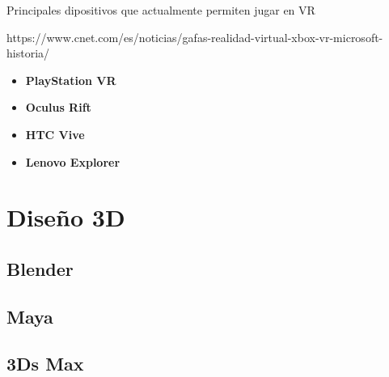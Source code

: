 Principales dipositivos que actualmente permiten jugar en VR

https://www.cnet.com/es/noticias/gafas-realidad-virtual-xbox-vr-microsoft-historia/

\begin{itemize}
    \item \textbf{PlayStation VR}
    \item \textbf{Oculus Rift}
    \item \textbf{HTC Vive}
    \item \textbf{Lenovo Explorer}
\end{itemize}


\section{Diseño 3D}

\subsection{Blender}

\subsection{Maya}

\subsection{3Ds Max}


